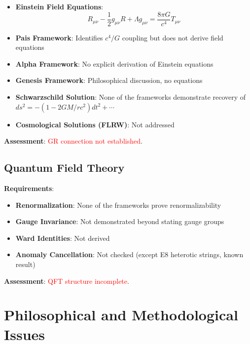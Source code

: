 \begin{itemize}
    \item \textbf{Einstein Field Equations}:
    \begin{equation}
    R_{\mu\nu} - \frac{1}{2} g_{\mu\nu} R + \Lambda g_{\mu\nu} = \frac{8\pi G}{c^4} T_{\mu\nu}
    \end{equation}

    \item \textbf{Pais Framework}: Identifies $c^4/G$ coupling but does not derive field equations

    \item \textbf{Alpha Framework}: No explicit derivation of Einstein equations

    \item \textbf{Genesis Framework}: Philosophical discussion, no equations

    \item \textbf{Schwarzschild Solution}: None of the frameworks demonstrate recovery of $ds^2 = -(1-2GM/rc^2)dt^2 + \cdots$

    \item \textbf{Cosmological Solutions (FLRW)}: Not addressed
\end{itemize}

\textbf{Assessment}: \textcolor{red}{GR connection not established}.

\subsection{Quantum Field Theory}

\textbf{Requirements}:
\begin{itemize}
    \item \textbf{Renormalization}: None of the frameworks prove renormalizability
    \item \textbf{Gauge Invariance}: Not demonstrated beyond stating gauge groups
    \item \textbf{Ward Identities}: Not derived
    \item \textbf{Anomaly Cancellation}: Not checked (except E8 heterotic strings, known result)
\end{itemize}

\textbf{Assessment}: \textcolor{red}{QFT structure incomplete}.

\section{Philosophical and Methodological Issues}

